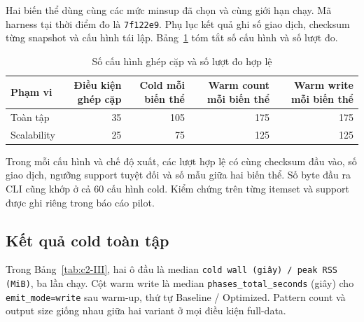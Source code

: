 Hai biến thể dùng cùng các mức minsup đã chọn và cùng giới hạn chạy. Mã harness tại thời điểm đo là \texttt{7f122e9}. Phụ lục kết quả ghi số giao dịch, checksum từng snapshot và cấu hình tái lập. Bảng~\ref{tab:c2-II} tóm tắt số cấu hình và số lượt đo.

\begin{table}[!t]
\centering\footnotesize
\caption{Số cấu hình ghép cặp và số lượt đo hợp lệ}
\label{tab:c2-II}
\setlength{\tabcolsep}{4pt}
\begin{tabular}{lrrrr}
\hline
\textbf{Phạm vi} & \textbf{Điều kiện ghép cặp} & \textbf{Cold mỗi biến thể} & \textbf{Warm count mỗi biến thể} & \textbf{Warm write mỗi biến thể} \\ \hline
Toàn tập & 35 & 105 & 175 & 175 \\
Scalability & 25 & 75 & 125 & 125 \\
\hline
\end{tabular}
\end{table}

Trong mỗi cấu hình và chế độ xuất, các lượt hợp lệ có cùng checksum đầu vào, số giao dịch, ngưỡng support tuyệt đối và số mẫu giữa hai biến thể. Số byte đầu ra CLI cũng khớp ở cả 60 cấu hình cold. Kiểm chứng trên từng itemset và support được ghi riêng trong báo cáo pilot.

\subsection{Kết quả cold toàn tập}

Trong Bảng~\ref{tab:c2-III}, hai ô đầu là median \nolinkurl{cold wall (giây) / peak RSS (MiB)}, ba lần chạy. Cột warm write là median \texttt{phases\_total\_seconds} (giây) cho \texttt{emit\_mode=write} sau warm-up, thứ tự Baseline / Optimized. Pattern count và output size giống nhau giữa hai variant ở mọi điều kiện full-data.

